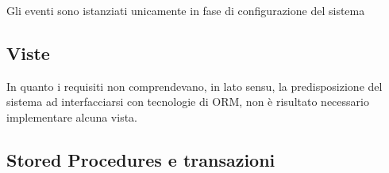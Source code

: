 Gli eventi sono istanziati unicamente in fase di configurazione del sistema


\pagebreak
{}

\subsection*{Viste}
%
%

In quanto i requisiti non comprendevano, in lato sensu, la predisposizione
del sistema ad interfacciarsi con tecnologie di ORM, non è risultato necessario
implementare alcuna vista.

\pagebreak

\subsection*{Stored Procedures e transazioni}
%
%

